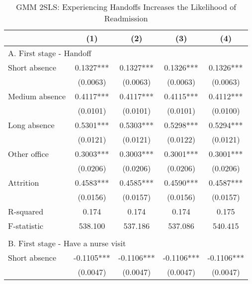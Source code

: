 \documentclass[final,12pt, notitlepage]{article}
\begin{document}
\begin{singlespace}
\begin{table}[H]
\footnotesize
\setlength\tabcolsep{0pt}
\centering
\caption{GMM 2SLS: Experiencing Handoffs Increases the Likelihood of Readmission}
\label{tab:iv}
\begin{threeparttable}
{
\def\sym#1{\ifmmode^{#1}\else\(^{#1}\)\fi}
\begin{tabular*}{\textwidth}{l@{\extracolsep{\fill}}*{4}{c}} %
\toprule
                    &\multicolumn{1}{c}{(1)}&\multicolumn{1}{c}{(2)}&\multicolumn{1}{c}{(3)}&\multicolumn{1}{c}{(4)}\\
\midrule
\multicolumn{5}{l}{A. First stage - Handoff} \\
Short absence       &      0.1327***&      0.1327***&      0.1326***&      0.1326***\\
                    &    (0.0063)   &    (0.0063)   &    (0.0063)   &    (0.0063)   \\
Medium absence      &      0.4117***&      0.4117***&      0.4115***&      0.4112***\\
                    &    (0.0101)   &    (0.0101)   &    (0.0101)   &    (0.0100)   \\
Long absence        &      0.5301***&      0.5303***&      0.5298***&      0.5294***\\
                    &    (0.0121)   &    (0.0121)   &    (0.0122)   &    (0.0121)   \\
Other office        &      0.3003***&      0.3003***&      0.3001***&      0.3001***\\
                    &    (0.0206)   &    (0.0206)   &    (0.0206)   &    (0.0206)   \\
Attrition           &      0.4583***&      0.4585***&      0.4590***&      0.4587***\\
                    &    (0.0156)   &    (0.0157)   &    (0.0156)   &    (0.0157)   \\
R-squared           &       0.174   &       0.174   &       0.174   &       0.175   \\
F-statistic         &     538.100   &     537.186   &     537.086   &     540.415   \\
\\
\multicolumn{5}{l}{B. First stage - Have a nurse visit} \\
Short absence       &     -0.1105***&     -0.1106***&     -0.1106***&     -0.1106***\\
                    &    (0.0047)   &    (0.0047)   &    (0.0047)   &    (0.0047)   \\

\end{tabular*}}
\end{threeparttable}
\end{table}
\end{singlespace}
\end{document}
